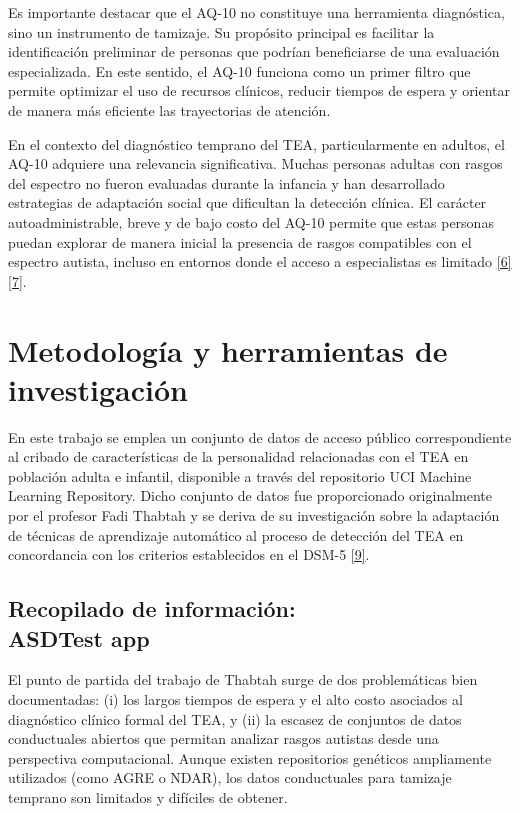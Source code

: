 Es importante destacar que el AQ-10 no constituye una herramienta diagnóstica, sino un instrumento de tamizaje. Su propósito principal es facilitar la identificación preliminar de personas que podrían beneficiarse de una evaluación especializada. En este sentido, el AQ-10 funciona como un primer filtro que permite optimizar el uso de recursos clínicos, reducir tiempos de espera y orientar de manera más eficiente las trayectorias de atención.

En el contexto del diagnóstico temprano del TEA, particularmente en adultos, el AQ-10 adquiere una relevancia significativa. Muchas personas adultas con rasgos del espectro no fueron evaluadas durante la infancia y han desarrollado estrategias de adaptación social que dificultan la detección clínica. El carácter autoadministrable, breve y de bajo costo del AQ-10 permite que estas personas puedan explorar de manera inicial la presencia de rasgos compatibles con el espectro autista, incluso en entornos donde el acceso a especialistas es limitado \hyperlink{6}{[6]} \hyperlink{7}{[7]}.

\section{Metodología y herramientas de investigación}
En este trabajo se emplea un conjunto de datos de acceso público correspondiente al cribado de características de la personalidad relacionadas con el  TEA en población adulta e infantil, disponible a través del repositorio UCI Machine Learning Repository. Dicho conjunto de datos fue proporcionado originalmente por el profesor Fadi Thabtah y se deriva de su investigación sobre la adaptación de técnicas de aprendizaje automático al proceso de detección del TEA en concordancia con los criterios establecidos en el DSM-5 \hyperlink{9}{[9]}.

\subsection{Recopilado de información: \\ ASDTest app}

El punto de partida del trabajo de Thabtah surge de dos problemáticas bien documentadas: (i) los largos tiempos de espera y el alto costo asociados al diagnóstico clínico formal del TEA, y (ii) la escasez de conjuntos de datos conductuales abiertos que permitan analizar rasgos autistas desde una perspectiva computacional. Aunque existen repositorios genéticos ampliamente utilizados (como AGRE o NDAR), los datos conductuales para tamizaje temprano son limitados y difíciles de obtener.

